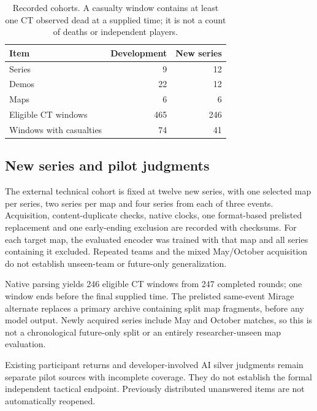 \begin{table}[t]
\caption{Recorded cohorts. A casualty window contains at least one CT observed dead at a supplied time; it is not a count of deaths or independent players.}
\label{tab:data}
\centering
\begin{tabular}{lrr}
\toprule
Item & Development & New series\\
\midrule
Series & 9 & 12\\ %
Demos & 22 & 12\\ %
Maps & 6 & 6\\ %
Eligible CT windows & 465 & 246\\ %
Windows with casualties & 74 & 41\\ %
\bottomrule
\end{tabular}
\end{table}

\subsection{New series and pilot judgments}
The external technical cohort is fixed at twelve new series, with one selected map per series, two series per map and four series from each of three events. Acquisition, content-duplicate checks, native clocks, one format-based prelisted replacement and one early-ending exclusion are recorded with checksums. For each target map, the evaluated encoder was trained with that map and all series containing it excluded. Repeated teams and the mixed May/October acquisition do not establish unseen-team or future-only generalization. %

Native parsing yields 246 eligible CT windows from 247 completed rounds; one window ends before the final supplied time. The prelisted same-event Mirage alternate replaces a primary archive containing split map fragments, before any model output. Newly acquired series include May and October matches, so this is not a chronological future-only split or an entirely researcher-unseen map evaluation. %

Existing participant returns and developer-involved AI silver judgments remain separate pilot sources with incomplete coverage. They do not establish the formal independent tactical endpoint. Previously distributed unanswered items are not automatically reopened.

